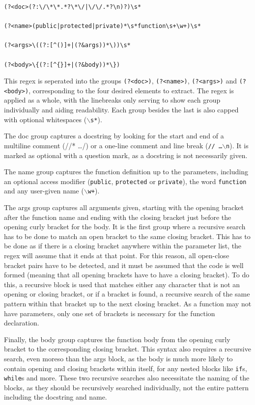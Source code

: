 \begin{verbatim}
(?<doc>(?:\/\*\*.*?\*\/|\/\/.*?\n)?)\s*

(?<name>(public|protected|private)*\s*function\s+\w+)\s*

(?<args>\((?:[^()]+|(?&args))*\))\s*

(?<body>\{(?:[^{}]+|(?&body))*\})
\end{verbatim}

This regex is seperated into the groups \texttt{(?<doc>)}, \texttt{(?<name>)}, \texttt{(?<args>)} and \texttt{(?<body>)}, corresponding to the four desired elements to extract.
The regex is applied as a whole, with the linebreaks only serving to show each group individually and aiding readability.
Each group besides the last is also capped with optional whitespaces (\texttt{$\backslash$s*}).

The doc group captures a docstring by looking for the start and end of a multiline comment (//* \dots */) or a one-line comment and line break (\texttt{// \dots $\backslash$n}). It is marked as optional with a question mark, as a docstring is not necessarily given.

The name group captures the function definition up to the parameters, including an optional access modifier (\texttt{public}, \texttt{protected} or \texttt{private}), the word \texttt{function} and any user-given name (\texttt{$\backslash$w+}).

The args group captures all arguments given, starting with the opening bracket after the function name and ending with the closing bracket just before the opening curly bracket for the body.
It is the first group where a recursive search has to be done to match an open bracket to the same closing bracket.
This has to be done as if there is a closing bracket anywhere within the parameter list, the \ac{regex} will assume that it ends at that point.
For this reason, all open-close bracket pairs have to be detected, and it must be assumed that the code is well formed (meaning that all opening brackets have to have a closing bracket).
To do this, a recursive block is used that matches either any character that is not an opening or closing bracket, or if a bracket is found, a recursive search of the same pattern within that bracket up to the next closing bracket.
As a function may not have parameters, only one set of brackets is necessary for the function declaration.

Finally, the body group captures the function body from the opening curly bracket to the corresponding closing bracket.
This syntax also requires a recursive search, even moreso than the args block, as the body is much more likely to contain opening and closing brackets within itself, for any nested blocks like \texttt{if}s, \texttt{while}s and more.
These two recursive searches also necessitate the naming of the blocks, as they should be recursively searched individually, not the entire pattern including the docstring and name.

